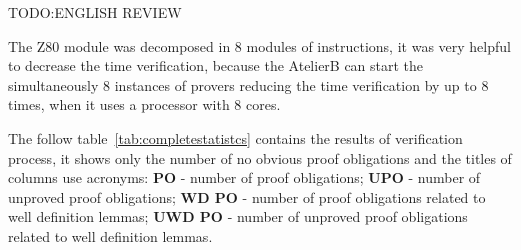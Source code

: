 \documentclass[a4paper]{llncs}
\begin{document}



TODO:ENGLISH REVIEW



The Z80 module was decomposed in 8 modules of instructions, it was very helpful to decrease the time verification, because the AtelierB can start the simultaneously 8 instances of provers reducing the time verification by up to 8 times, when it uses a processor with 8 cores.

The follow table~\ref{tab:completestatistcs} contains the results of verification process, it shows only the number of no obvious proof obligations and the titles of columns use acronyms: {\small \textbf{PO}} - number of proof obligations; {\small \textbf{UPO}} - number of unproved proof obligations; {\small \textbf{WD PO}} - number of proof obligations  related to well definition lemmas; {\small \textbf{UWD PO}} - number of unproved proof obligations related to well definition lemmas.
 
\end{document}
